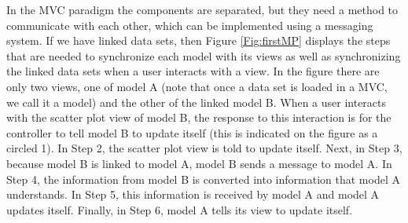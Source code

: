 \documentclass[11pt]{article}
\newcommand{\Robject}[1]{{\texttt{#1}}}
\begin{document}
In the MVC paradigm the components are separated, but they need a 
method to communicate with each other, which can be implemented using 
a messaging system.  If we have linked data sets, then Figure
\ref{Fig:firstMP} displays the steps that are needed to synchronize 
each model with its views as well as synchronizing the linked data sets 
when a user interacts with a view.
In the figure there are only two views, one of model A (note 
that once a data set is loaded in a MVC, we call it a model) and the
other of the linked model B.  When a user
interacts with the scatter plot view of model B, the response to
this interaction is for the controller to tell model B to update itself 
(this is indicated
on the figure as a circled 1).  In Step 2, the scatter plot view is
told to update itself.  Next, in Step 3, because model B is linked
to model A, model B sends a message to model A.  In Step 4,
the information from model B is converted into information that
model A understands.  In Step 5, this information is received by
model A and model A updates itself.  Finally, in Step 6, model
A tells its view to update itself.


\end{document}
